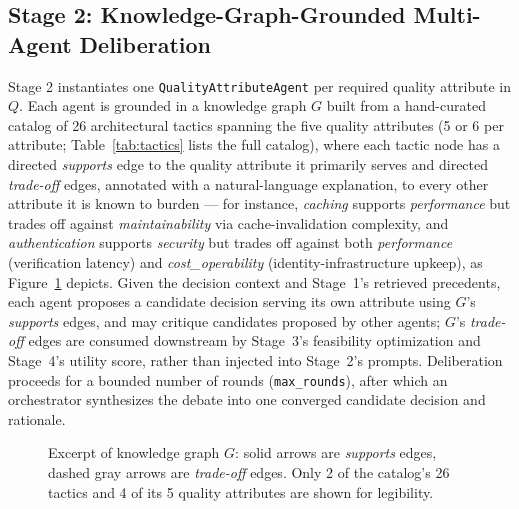 \documentclass[lettersize,journal]{IEEEtran}
\begin{document}
\subsection{Stage 2: Knowledge-Graph-Grounded Multi-Agent Deliberation}

Stage 2 instantiates one \texttt{QualityAttributeAgent} per required quality attribute in $Q$. Each agent is grounded in a knowledge graph $G$ built from a hand-curated catalog of 26 architectural tactics spanning the five quality attributes (5 or 6 per attribute; Table~\ref{tab:tactics} lists the full catalog), where each tactic node has a directed \emph{supports} edge to the quality attribute it primarily serves and directed \emph{trade-off} edges, annotated with a natural-language explanation, to every other attribute it is known to burden --- for instance, \emph{caching} supports \emph{performance} but trades off against \emph{maintainability} via cache-invalidation complexity, and \emph{authentication} supports \emph{security} but trades off against both \emph{performance} (verification latency) and \emph{cost\_operability} (identity-infrastructure upkeep), as Figure~\ref{fig:kg-excerpt} depicts. Given the decision context and Stage~1's retrieved precedents, each agent proposes a candidate decision serving its own attribute using $G$'s \emph{supports} edges, and may critique candidates proposed by other agents; $G$'s \emph{trade-off} edges are consumed downstream by Stage~3's feasibility optimization and Stage~4's utility score, rather than injected into Stage~2's prompts. Deliberation proceeds for a bounded number of rounds (\texttt{max\_rounds}), after which an orchestrator synthesizes the debate into one converged candidate decision and rationale.

\begin{figure}[t]
\centering
{}
\caption{Excerpt of knowledge graph $G$: solid arrows are \emph{supports} edges, dashed gray arrows are \emph{trade-off} edges. Only 2 of the catalog's 26 tactics and 4 of its 5 quality attributes are shown for legibility.\label{fig:kg-excerpt}}
\end{figure}
\end{document}
